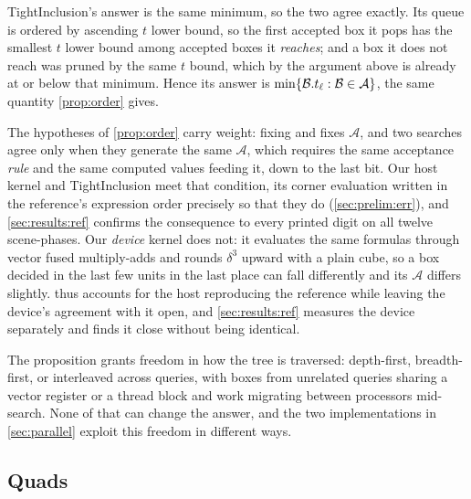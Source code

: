 \begin{remark}
\label{rem:ti}
TightInclusion's answer is the same minimum, so the two agree exactly. Its queue
is ordered by ascending $t$ lower bound, so the first accepted box it pops has the
smallest $t$ lower bound among accepted boxes it \emph{reaches}; and a box it
does not reach was pruned by the same $t$ bound, which by the argument above is
already at or below that minimum. Hence its answer is
$\min\{\mathcal{B}.t_{\ell} : \mathcal{B} \in \mathcal{A}\}$, the same quantity
\cref{prop:order} gives.
\end{remark}

The hypotheses of \cref{prop:order} carry weight: fixing  and
 fixes $\mathcal{A}$, and two searches agree only when they generate the
same $\mathcal{A}$, which requires the same acceptance \emph{rule} and the same
computed values feeding it, down to the last bit. Our host kernel and
TightInclusion meet that condition, its corner evaluation written in the
reference's expression order precisely so that they do (\cref{sec:prelim:err}),
and \cref{sec:results:ref} confirms the consequence to every printed digit on all
twelve scene-phases. Our \emph{device} kernel does not: it evaluates the same
formulas through vector fused multiply-adds and rounds $\delta^{3}$ upward with a
plain cube, so a box decided in the last few units in the last place can fall
differently and its $\mathcal{A}$ differs slightly.  thus
accounts for the host reproducing the reference while leaving the device's
agreement with it open, and \cref{sec:results:ref} measures the device separately
and finds it close without being identical.

The proposition grants freedom in how the tree is traversed: depth-first,
breadth-first, or interleaved across queries, with boxes from unrelated queries
sharing a vector register or a thread block and work migrating between processors
mid-search. None of that can change the answer, and the two implementations in
\cref{sec:parallel} exploit this freedom in different ways.

\subsection{Quads}
\label{sec:np:quad}

